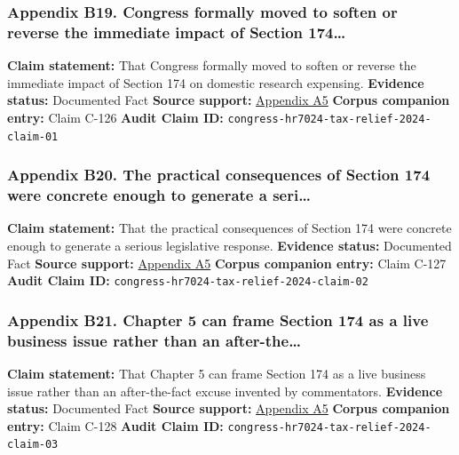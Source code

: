 \documentclass[
  american,
  11pt,
  letterpaper,
]{article}
\begin{document}
\subsubsection{Appendix B19. Congress formally moved to soften or
reverse the immediate impact of Section
174\ldots{}}\label{appendix-b19-congress-formally-moved-to-soften-or-reverse-the-immediate-impact-of-section-174}

\textbf{Claim statement:} That Congress formally moved to soften or
reverse the immediate impact of Section 174 on domestic research
expensing. \textbf{Evidence status:} Documented Fact \textbf{Source
support:}
\hyperref[appendix-a5-h-r-7024-tax-relief-for-american-families-and-workers-act-of-2024]{Appendix
A5} \textbf{Corpus companion entry:} Claim C-126 \textbf{Audit Claim
ID:} \texttt{congress-hr7024-tax-relief-2024-claim-01}

\subsubsection{Appendix B20. The practical consequences of Section 174
were concrete enough to generate a
seri\ldots{}}\label{appendix-b20-the-practical-consequences-of-section-174-were-concrete-enough-to-generate-a-seri}

\textbf{Claim statement:} That the practical consequences of Section 174
were concrete enough to generate a serious legislative response.
\textbf{Evidence status:} Documented Fact \textbf{Source support:}
\hyperref[appendix-a5-h-r-7024-tax-relief-for-american-families-and-workers-act-of-2024]{Appendix
A5} \textbf{Corpus companion entry:} Claim C-127 \textbf{Audit Claim
ID:} \texttt{congress-hr7024-tax-relief-2024-claim-02}

\subsubsection{Appendix B21. Chapter 5 can frame Section 174 as a live
business issue rather than an
after-the\ldots{}}\label{appendix-b21-chapter-5-can-frame-section-174-as-a-live-business-issue-rather-than-an-after-the}

\textbf{Claim statement:} That Chapter 5 can frame Section 174 as a live
business issue rather than an after-the-fact excuse invented by
commentators. \textbf{Evidence status:} Documented Fact \textbf{Source
support:}
\hyperref[appendix-a5-h-r-7024-tax-relief-for-american-families-and-workers-act-of-2024]{Appendix
A5} \textbf{Corpus companion entry:} Claim C-128 \textbf{Audit Claim
ID:} \texttt{congress-hr7024-tax-relief-2024-claim-03}
\end{document}
